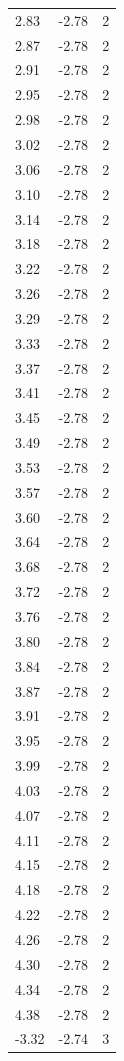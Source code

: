 \begin{longtable}{lrr}
  2.83 & -2.78 & 2 \\
  2.87 & -2.78 & 2 \\
  2.91 & -2.78 & 2 \\
  2.95 & -2.78 & 2 \\
  2.98 & -2.78 & 2 \\
  3.02 & -2.78 & 2 \\
  3.06 & -2.78 & 2 \\
  3.10 & -2.78 & 2 \\
  3.14 & -2.78 & 2 \\
  3.18 & -2.78 & 2 \\
  3.22 & -2.78 & 2 \\
  3.26 & -2.78 & 2 \\
  3.29 & -2.78 & 2 \\
  3.33 & -2.78 & 2 \\
  3.37 & -2.78 & 2 \\
  3.41 & -2.78 & 2 \\
  3.45 & -2.78 & 2 \\
  3.49 & -2.78 & 2 \\
  3.53 & -2.78 & 2 \\
  3.57 & -2.78 & 2 \\
  3.60 & -2.78 & 2 \\
  3.64 & -2.78 & 2 \\
  3.68 & -2.78 & 2 \\
  3.72 & -2.78 & 2 \\
  3.76 & -2.78 & 2 \\
  3.80 & -2.78 & 2 \\
  3.84 & -2.78 & 2 \\
  3.87 & -2.78 & 2 \\
  3.91 & -2.78 & 2 \\
  3.95 & -2.78 & 2 \\
  3.99 & -2.78 & 2 \\
  4.03 & -2.78 & 2 \\
  4.07 & -2.78 & 2 \\
  4.11 & -2.78 & 2 \\
  4.15 & -2.78 & 2 \\
  4.18 & -2.78 & 2 \\
  4.22 & -2.78 & 2 \\
  4.26 & -2.78 & 2 \\
  4.30 & -2.78 & 2 \\
  4.34 & -2.78 & 2 \\
  4.38 & -2.78 & 2 \\
  -3.32 & -2.74 & 3 \\

\end{longtable}
